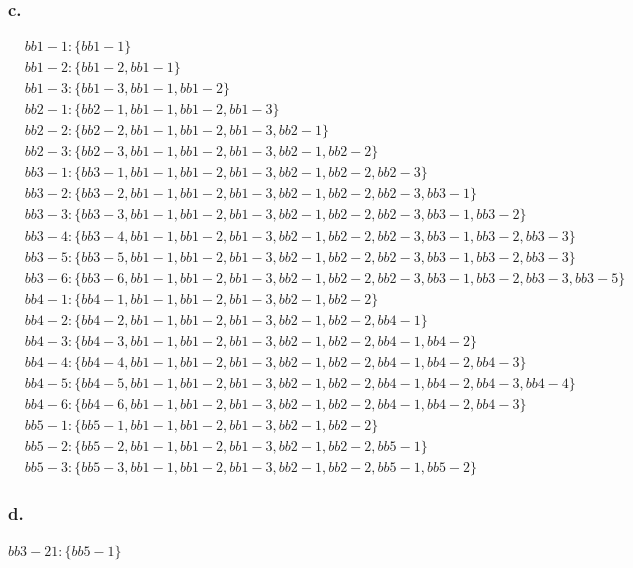 \documentclass{article}
\begin{document}
	\subsubsection*{c.}
	\begin{align*}
		&bb1-1: \{bb1-1\} \\
		&bb1-2: \{bb1-2, bb1-1\} \\
		&bb1-3: \{bb1-3, bb1-1, bb1-2\} \\
		&bb2-1: \{bb2-1, bb1-1, bb1-2, bb1-3\} \\
		&bb2-2: \{bb2-2, bb1-1, bb1-2, bb1-3, bb2-1\} \\
		&bb2-3: \{bb2-3, bb1-1, bb1-2, bb1-3, bb2-1, bb2-2\} \\
		&bb3-1: \{bb3-1, bb1-1, bb1-2, bb1-3, bb2-1, bb2-2, bb2-3\} \\
		&bb3-2: \{bb3-2, bb1-1, bb1-2, bb1-3, bb2-1, bb2-2, bb2-3, bb3-1\} \\
		&bb3-3: \{bb3-3, bb1-1, bb1-2, bb1-3, bb2-1, bb2-2, bb2-3, bb3-1, bb3-2\} \\
		&bb3-4: \{bb3-4, bb1-1, bb1-2, bb1-3, bb2-1, bb2-2, bb2-3, bb3-1, bb3-2, bb3-3\} \\
		&bb3-5: \{bb3-5, bb1-1, bb1-2, bb1-3, bb2-1, bb2-2, bb2-3, bb3-1, bb3-2, bb3-3\} \\
		&bb3-6: \{bb3-6, bb1-1, bb1-2, bb1-3, bb2-1, bb2-2, bb2-3, bb3-1, bb3-2, bb3-3, bb3-5\} \\
		&bb4-1: \{bb4-1, bb1-1, bb1-2, bb1-3, bb2-1, bb2-2\} \\
		&bb4-2: \{bb4-2, bb1-1, bb1-2, bb1-3, bb2-1, bb2-2, bb4-1\} \\
		&bb4-3: \{bb4-3, bb1-1, bb1-2, bb1-3, bb2-1, bb2-2, bb4-1, bb4-2\} \\
		&bb4-4: \{bb4-4, bb1-1, bb1-2, bb1-3, bb2-1, bb2-2, bb4-1, bb4-2, bb4-3\} \\
		&bb4-5: \{bb4-5, bb1-1, bb1-2, bb1-3, bb2-1, bb2-2, bb4-1, bb4-2, bb4-3, bb4-4\} \\
		&bb4-6: \{bb4-6, bb1-1, bb1-2, bb1-3, bb2-1, bb2-2, bb4-1, bb4-2, bb4-3\} \\
		&bb5-1: \{bb5-1, bb1-1, bb1-2, bb1-3, bb2-1, bb2-2\} \\
		&bb5-2: \{bb5-2, bb1-1, bb1-2, bb1-3, bb2-1, bb2-2, bb5-1\} \\
		&bb5-3: \{bb5-3, bb1-1, bb1-2, bb1-3, bb2-1, bb2-2, bb5-1, bb5-2\}
	\end{align*}

	\subsubsection*{d.}
	$bb3-21: \{bb5-1\}$
\end{document}
